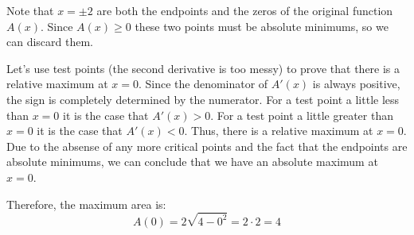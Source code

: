 \documentclass[letterpaper,12pt,fleqn]{article}
\begin{document}
Note that \(x=\pm2\) are both the endpoints and the zeros of the original function \(A(x)\).  Since \(A(x)\ge0\)
these two points must be absolute minimums, so we can discard them.

Let's use test points (the second derivative is too messy) to prove that there is a relative maximum at \(x=0\).
Since the denominator of \(A'(x)\) is always positive, the sign is completely determined by the numerator.  For a
test point a little less than \(x=0\) it is the case that \(A'(x)>0\).  For a test point a little greater than
\(x=0\) it is the case that \(A'(x)<0\).  Thus, there is a relative maximum at \(x=0\).  Due to the absense of any
more critical points and the fact that the endpoints are absolute minimums, we can conclude that we have an
absolute maximum at \(x=0\).

Therefore, the maximum area is:
\[A(0)=2\sqrt{4-0^2}=2\cdot2=4\]
\end{document}
